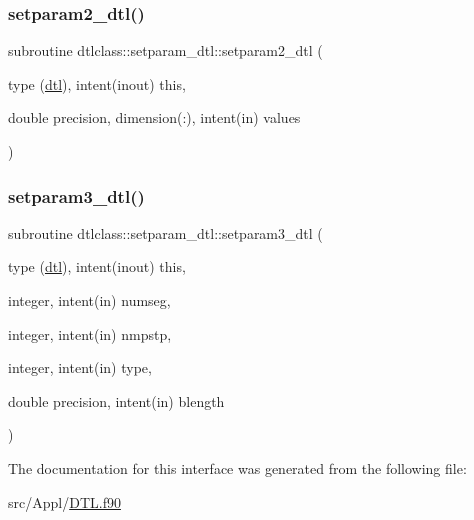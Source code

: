 \mbox{\label{interfacedtlclass_1_1setparam__dtl_a270334a3ecb86adef07d3d58ff9b2d07}} 
\subsubsection{\texorpdfstring{setparam2\_dtl()}{setparam2\_dtl()}}
{\footnotesize\ttfamily subroutine dtlclass\+::setparam\+\_\+dtl\+::setparam2\+\_\+dtl (\begin{DoxyParamCaption}\item[{type (\mbox{\hyperlink{namespacedtlclass_structdtlclass_1_1dtl}{dtl}}), intent(inout)}]{this,  }\item[{double precision, dimension(\+:), intent(in)}]{values }\end{DoxyParamCaption})}

\mbox{\label{interfacedtlclass_1_1setparam__dtl_addbf0daa267c5e8ed241d8a86460f315}} 
\subsubsection{\texorpdfstring{setparam3\_dtl()}{setparam3\_dtl()}}
{\footnotesize\ttfamily subroutine dtlclass\+::setparam\+\_\+dtl\+::setparam3\+\_\+dtl (\begin{DoxyParamCaption}\item[{type (\mbox{\hyperlink{namespacedtlclass_structdtlclass_1_1dtl}{dtl}}), intent(inout)}]{this,  }\item[{integer, intent(in)}]{numseg,  }\item[{integer, intent(in)}]{nmpstp,  }\item[{integer, intent(in)}]{type,  }\item[{double precision, intent(in)}]{blength }\end{DoxyParamCaption})}



The documentation for this interface was generated from the following file\+:\begin{DoxyCompactItemize}
\item 
src/\+Appl/\mbox{\hyperlink{_d_t_l_8f90}{D\+T\+L.\+f90}}\end{DoxyCompactItemize}
